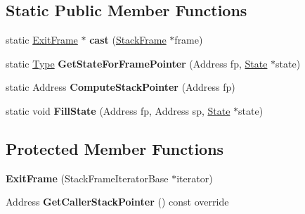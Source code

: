 \subsection*{Static Public Member Functions}
\begin{DoxyCompactItemize}
\item 
static \hyperlink{classv8_1_1internal_1_1_exit_frame}{Exit\+Frame} $\ast$ {\bfseries cast} (\hyperlink{classv8_1_1_stack_frame}{Stack\+Frame} $\ast$frame)\hypertarget{classv8_1_1internal_1_1_exit_frame_a6cfb53b1f5eb6913010c446e7813f825}{}\label{classv8_1_1internal_1_1_exit_frame_a6cfb53b1f5eb6913010c446e7813f825}

\item 
static \hyperlink{classv8_1_1internal_1_1_type}{Type} {\bfseries Get\+State\+For\+Frame\+Pointer} (Address fp, \hyperlink{classv8_1_1internal_1_1_state}{State} $\ast$state)\hypertarget{classv8_1_1internal_1_1_exit_frame_af0f367c49f10592cba56310be5d6f7b6}{}\label{classv8_1_1internal_1_1_exit_frame_af0f367c49f10592cba56310be5d6f7b6}

\item 
static Address {\bfseries Compute\+Stack\+Pointer} (Address fp)\hypertarget{classv8_1_1internal_1_1_exit_frame_a68645e1e5b7b6014d97a50dd8434ac29}{}\label{classv8_1_1internal_1_1_exit_frame_a68645e1e5b7b6014d97a50dd8434ac29}

\item 
static void {\bfseries Fill\+State} (Address fp, Address sp, \hyperlink{classv8_1_1internal_1_1_state}{State} $\ast$state)\hypertarget{classv8_1_1internal_1_1_exit_frame_a1c3835075d1f0f6b8b31896ca89f1a77}{}\label{classv8_1_1internal_1_1_exit_frame_a1c3835075d1f0f6b8b31896ca89f1a77}

\end{DoxyCompactItemize}
\subsection*{Protected Member Functions}
\begin{DoxyCompactItemize}
\item 
{\bfseries Exit\+Frame} (Stack\+Frame\+Iterator\+Base $\ast$iterator)\hypertarget{classv8_1_1internal_1_1_exit_frame_a0664071bd3448a6cd032da63b6fafbe5}{}\label{classv8_1_1internal_1_1_exit_frame_a0664071bd3448a6cd032da63b6fafbe5}

\item 
Address {\bfseries Get\+Caller\+Stack\+Pointer} () const  override\hypertarget{classv8_1_1internal_1_1_exit_frame_a0925f902c6d5ddc4d3b9068ab94e4b65}{}\label{classv8_1_1internal_1_1_exit_frame_a0925f902c6d5ddc4d3b9068ab94e4b65}

\end{DoxyCompactItemize}

